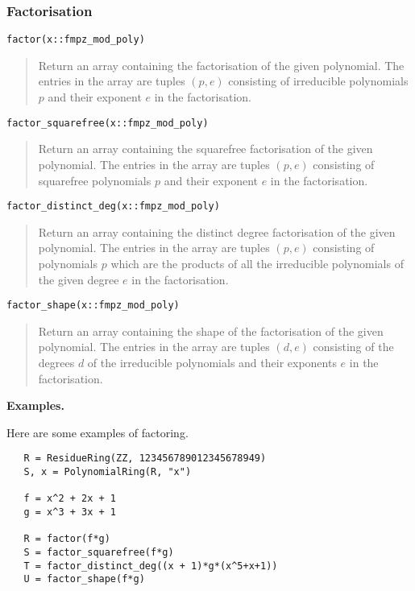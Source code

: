 \documentclass[a4paper,10pt]{article}
\newcommand{\desc}[1]{\vspace{-3mm}\begin{quote}#1\end{quote}}
\begin{document}
{{\subsubsection{Factorisation}

\begin{lstlisting}
factor(x::fmpz_mod_poly)
\end{lstlisting}

\desc{Return an array containing the factorisation of the given polynomial. The entries in
the array are tuples $(p, e)$ consisting of irreducible polynomials $p$ and their exponent
$e$ in the factorisation.}

\begin{lstlisting}
factor_squarefree(x::fmpz_mod_poly)
\end{lstlisting}

\desc{Return an array containing the squarefree factorisation of the given polynomial. The
entries in the array are tuples $(p, e)$ consisting of squarefree polynomials $p$ and their
exponent $e$ in the factorisation.}

\begin{lstlisting}
factor_distinct_deg(x::fmpz_mod_poly)
\end{lstlisting}

\desc{Return an array containing the distinct degree factorisation of the given polynomial.
The entries in the array are tuples $(p, e)$ consisting of polynomials $p$ which are the
products of all the irreducible polynomials of the given degree $e$ in the factorisation.}

\begin{lstlisting}
factor_shape(x::fmpz_mod_poly)
\end{lstlisting}

\desc{Return an array containing the shape of the factorisation of the given polynomial.
The entries in the array are tuples $(d, e)$ consisting of the degrees $d$ of the
irreducible polynomials and their exponents $e$ in the factorisation.}

\textbf{Examples.}

Here are some examples of factoring.

\begin{lstlisting}
   R = ResidueRing(ZZ, 123456789012345678949)
   S, x = PolynomialRing(R, "x")

   f = x^2 + 2x + 1
   g = x^3 + 3x + 1

   R = factor(f*g)
   S = factor_squarefree(f*g)
   T = factor_distinct_deg((x + 1)*g*(x^5+x+1))
   U = factor_shape(f*g)
\end{lstlisting}

}}
\end{document}
